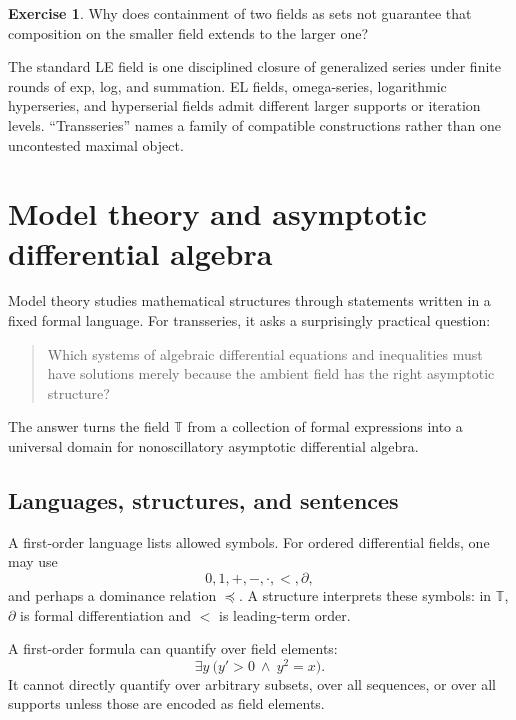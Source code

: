 \documentclass[11pt,openany]{book}
\theoremstyle{definition}
\newtheorem{exercise}{Exercise}[chapter]
\theoremstyle{plain}
\theoremstyle{remark}
\newcommand{\T}{\mathbb{T}}
\begin{document}
\begin{exercise}
Why does containment of two fields as sets not guarantee that composition on the smaller field extends to the larger one?
\end{exercise}

\begin{summarybox}
The standard LE field is one disciplined closure of generalized series under finite rounds of exp, log, and summation. EL fields, omega-series, logarithmic hyperseries, and hyperserial fields admit different larger supports or iteration levels. ``Transseries'' names a family of compatible constructions rather than one uncontested maximal object.
\end{summarybox}


\chapter{Model theory and asymptotic differential algebra}\label{ch:model-theory}

Model theory studies mathematical structures through statements written in a fixed formal language. For transseries, it asks a surprisingly practical question:

\begin{quote}
Which systems of algebraic differential equations and inequalities must have solutions merely because the ambient field has the right asymptotic structure?
\end{quote}

The answer turns the field $\T$ from a collection of formal expressions into a universal domain for nonoscillatory asymptotic differential algebra.

\section{Languages, structures, and sentences}

A first-order language lists allowed symbols. For ordered differential fields, one may use
\[
 0,1,+,-,\cdot,<,\partial,
\]
and perhaps a dominance relation $\preceq$. A structure interprets these symbols: in $\T$, $\partial$ is formal differentiation and $<$ is leading-term order.

A first-order formula can quantify over field elements:
\[
 \exists y\ \bigl(y'>0\ \wedge\ y^2=x\bigr).
\]
It cannot directly quantify over arbitrary subsets, over all sequences, or over all supports unless those are encoded as field elements.
\end{document}
